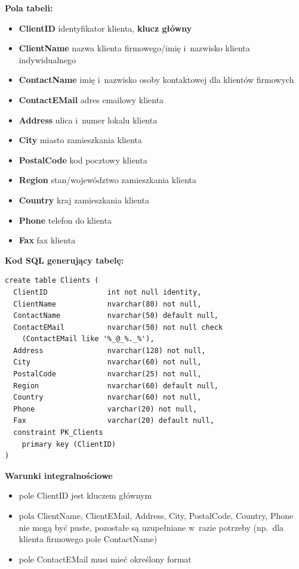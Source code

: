 \documentclass[12pt, a4paper]{mwrep}
\begin{document}
\noindent \textbf{Pola tabeli:}
\begin{itemize}
  \item \textbf{ClientID} \ppauza identyfikator klienta, \textbf{klucz główny}
  \item \textbf{ClientName} \ppauza nazwa klienta firmowego/imię i~nazwisko klienta indywidualnego
  \item \textbf{ContactName} \ppauza imię i~nazwisko osoby kontaktowej dla klientów firmowych
  \item \textbf{ContactEMail} \ppauza adres e\dywiz{}mailowy klienta
  \item \textbf{Address} \ppauza ulica i~numer lokalu klienta
  \item \textbf{City} \ppauza miasto zamieszkania klienta
  \item \textbf{PostalCode} \ppauza kod pocztowy klienta
  \item \textbf{Region} \ppauza stan/województwo zamieszkania klienta
  \item \textbf{Country} \ppauza kraj zamieszkania klienta
  \item \textbf{Phone} \ppauza telefon do klienta
  \item \textbf{Fax} \ppauza fax klienta
\end{itemize}

\vspace{0.5cm}
\noindent \textbf{Kod SQL generujący tabelę:}

\begin{lstlisting}
create table Clients (
  ClientID              int not null identity,
  ClientName            nvarchar(80) not null,
  ContactName           nvarchar(50) default null,
  ContactEMail          nvarchar(50) not null check
    (ContactEMail like '%_@_%._%'),
  Address               nvarchar(128) not null,
  City                  nvarchar(60) not null,
  PostalCode            nvarchar(25) not null,
  Region                nvarchar(60) default null,
  Country               nvarchar(60) not null,
  Phone                 varchar(20) not null,
  Fax                   varchar(20) default null,
  constraint PK_Clients 
    primary key (ClientID)
)
\end{lstlisting}

\vspace{0.5cm}
\noindent \textbf{Warunki integralnościowe}
\begin{itemize}
  \item pole ClientID jest kluczem głównym
  \item pola ClientName, ClientEMail, Address, City, PostalCode, Country, Phone nie mogą być puste, pozostałe są uzupełniane w~razie potrzeby (np.~dla klienta firmowego pole ContactName)
  \item pole ContactEMail musi mieć określony format
\end{itemize}
\end{document}
